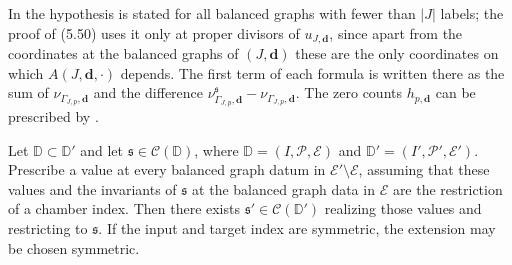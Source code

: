 In \cite{grossetal2022open} the hypothesis is stated for all balanced
graphs with fewer than $|J|$ labels; the proof of (5.50) uses it only at
proper divisors of $u_{J,\mathbf d}$, since apart from the coordinates at
the balanced graphs of $(J,\mathbf d)$ these are the only coordinates on
which $A(J,\mathbf d,\cdot)$ depends.  The first term of each formula is
written there as the sum of $\nu_{\Gamma_{J,p},\mathbf d}$ and the difference
$\nu^{\mathfrak s}_{\Gamma_{J,p},\mathbf d}-\nu_{\Gamma_{J,p},\mathbf d}$.
The zero counts $h_{p,\mathbf d}$ can be
prescribed by \cite[Lem.~5.17]{grossetal2022open}.

\begin{theorem}
\label{thm:relative-endpoint-lifting}
Let $\mathbb D\subset\mathbb D'$ and let
$\mathfrak s\in\mathcal C(\mathbb D)$, where $\mathbb D=(I,\mathscr P,\mathcal E)$
and $\mathbb D'=(I',\mathscr P',\mathcal E')$.  Prescribe a value at every balanced
graph datum in $\mathcal E'\setminus\mathcal E$, assuming that these values
and the invariants of $\mathfrak s$ at the balanced graph data in
$\mathcal E$ are the restriction of a chamber index.  Then there exists
$\mathfrak s'\in\mathcal C(\mathbb D')$ realizing those values and
restricting to $\mathfrak s$.  If the input and target index are
symmetric, the extension may be chosen symmetric.
\end{theorem}

